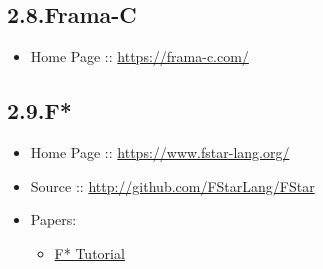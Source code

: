 \documentclass[12pt,twoside]{article}
\begin{document}
\subsection{2.8.\hspace*{0.5em}Frama-C}\label{sec-frama-c}%

\begin{itemize}[noitemsep,topsep=\mdcompacttopsep]%

\item{}Home Page :: \href{https://frama-c.com/}{{\ttfamily https://\hspace{0pt}frama-\hspace{0pt}c.\hspace{0pt}com/\hspace{0pt}}}%
\end{itemize}%

\subsection{2.9.\hspace*{0.5em}F*}\label{sec-f-}%

\begin{itemize}%

\item{}
Home Page :: \href{https://www.fstar-lang.org/}{{\ttfamily https://\hspace{0pt}www.\hspace{0pt}fstar-\hspace{0pt}lang.\hspace{0pt}org/\hspace{0pt}}}%

\item{}
Source :: \href{http://github.com/FStarLang/FStar}{{\ttfamily http://\hspace{0pt}github.\hspace{0pt}com/\hspace{0pt}FStarLang/\hspace{0pt}FStar}}%

\item{}
Papers:%

\begin{itemize}[noitemsep,topsep=\mdcompacttopsep]%

\item{}\href{https://www.fstar-lang.org/tutorial/}{F* Tutorial}%
\end{itemize}%
\end{itemize}%
\end{document}
